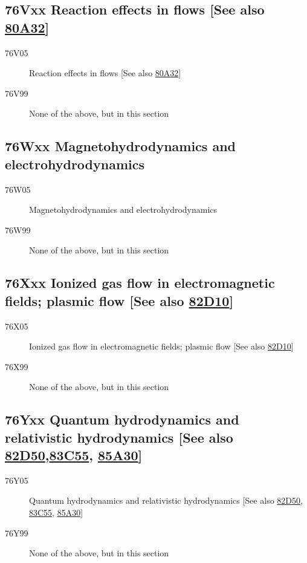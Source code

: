 \documentclass[letterpaper]{article}
\begin{document}
\subsection*{76Vxx  Reaction effects in flows [See also \hyperref[80A32]{80A32}] }\label{76Vxx}
\begin{description}  
\item [76V05]\label{76V05} Reaction effects in flows [See also \hyperref[80A32]{80A32}]
\item [76V99]\label{76V99} None of the above, but in this section
\end{description}
\subsection*{76Wxx  Magnetohydrodynamics and electrohydrodynamics }\label{76Wxx}
\begin{description}  
\item [76W05]\label{76W05} Magnetohydrodynamics and electrohydrodynamics
\item [76W99]\label{76W99} None of the above, but in this section
\end{description}
\subsection*{76Xxx  Ionized gas flow in electromagnetic fields; plasmic flow [See also \hyperref[82D10]{82D10}] }\label{76Xxx}
\begin{description}  
\item [76X05]\label{76X05} Ionized gas flow in electromagnetic fields; plasmic flow [See also \hyperref[82D10]{82D10}]
\item [76X99]\label{76X99} None of the above, but in this section
\end{description}
\subsection*{76Yxx  Quantum hydrodynamics and relativistic hydrodynamics [See also \hyperref[82D50]{82D50},\newline \hyperref[83C55]{83C55}, \hyperref[85A30]{85A30}] }\label{76Yxx}
\begin{description}  
\item [76Y05]\label{76Y05} Quantum hydrodynamics and relativistic hydrodynamics [See also \hyperref[82D50]{82D50}, \hyperref[83C55]{83C55}, \hyperref[85A30]{85A30}]
\item [76Y99]\label{76Y99} None of the above, but in this section
\end{description}
\end{document}
